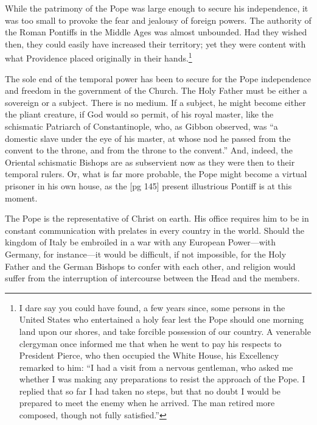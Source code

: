 While the patrimony of the Pope was large
enough to secure his independence, it was too small
to provoke the fear and jealousy of foreign powers.
The authority of the Roman Pontiffs in the
Middle Ages was almost unbounded. Had they
wished then, they could easily have increased their
territory; yet they were content with what Providence
placed originally in their hands.\footnote{I
dare say you could have found, a few years since, some
persons in the United States who entertained a holy fear lest
the Pope should one morning land upon our shores, and take
forcible possession of our country. A venerable clergyman once
informed me that when he went to pay his respects to President
Pierce, who then occupied the White House, his Excellency remarked
to him: “I had a visit from a nervous gentleman, who
asked me whether I was making any preparations to resist the
approach of the Pope. I replied that so far I had taken no
steps, but that no doubt I would be prepared to meet the enemy
when he arrived. The man retired more composed, though not
fully satisfied.”}

The sole end of the temporal power has been to
secure for the Pope independence and freedom in
the government of the Church. The Holy Father
must be either a sovereign or a subject. There is
no medium. If a subject, he might become either
the pliant creature, if God would so permit, of his
royal master, like the schismatic Patriarch of Constantinople,
who, as Gibbon observed, was “a domestic
slave under the eye of his master, at whose
nod he passed from the convent to the throne, and
from the throne to the convent.” And, indeed,
the Oriental schismatic Bishops are as subservient
now as they were then to their temporal rulers.
Or, what is far more probable, the Pope might become
a virtual prisoner in his own house, as the
[pg 145]
present illustrious Pontiff is at this moment.

The Pope is the representative of Christ on
earth. His office requires him to be in constant
communication with prelates in every country in
the world. Should the kingdom of Italy be embroiled
in a war with any European Power—with
Germany, for instance—it would be difficult, if not
impossible, for the Holy Father and the German
Bishops to confer with each other, and religion
would suffer from the interruption of intercourse
between the Head and the members.

